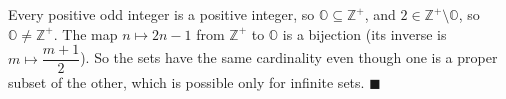 Every positive odd integer is a positive integer, so $\mathbb O\subseteq\mathbb Z^+$, and $2\in\mathbb Z^+\setminus\mathbb O$, so $\mathbb O\ne\mathbb Z^+$. The map $n\mapsto2n-1$ from $\mathbb Z^+$ to $\mathbb O$ is a bijection (its inverse is $m\mapsto\dfrac{m+1}{2}$). So the sets have the same cardinality even though one is a proper subset of the other, which is possible only for infinite sets. $\blacksquare$
